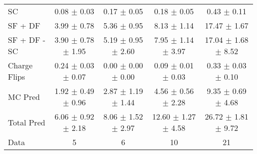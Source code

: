 \begin{tabular}{l|cccc}
                                 SC &  0.08 $\pm$  0.03 &  0.17 $\pm$  0.05 &  0.18 $\pm$  0.05 &  0.43 $\pm$  0.11 \\
                            SF + DF &  3.99 $\pm$  0.78 &  5.36 $\pm$  0.95 &  8.13 $\pm$  1.14 & 17.47 $\pm$  1.67 \\
\hline
                       SF + DF - SC &  3.90 $\pm$  0.78 $\pm$  1.95 &  5.19 $\pm$  0.95 $\pm$  2.60 &  7.95 $\pm$  1.14 $\pm$  3.97 & 17.04 $\pm$  1.68 $\pm$  8.52 \\
\hline\hline
                       Charge Flips &  0.24 $\pm$  0.03 $\pm$  0.07 &  0.00 $\pm$  0.00 $\pm$  0.00 &  0.09 $\pm$  0.01 $\pm$  0.03 &  0.33 $\pm$  0.03 $\pm$  0.10 \\
\hline
                            MC Pred &  1.92 $\pm$  0.49 $\pm$  0.96 &  2.87 $\pm$  1.19 $\pm$  1.44 &  4.56 $\pm$  0.56 $\pm$  2.28 &  9.35 $\pm$  0.69 $\pm$  4.68 \\
\hline
                         Total Pred &  6.06 $\pm$  0.92 $\pm$  2.18 &  8.06 $\pm$  1.52 $\pm$  2.97 & 12.60 $\pm$  1.27 $\pm$  4.58 & 26.72 $\pm$  1.81 $\pm$  9.72 \\
\hline\hline
                               Data &     5 &     6 &    10 &    21 \\
\hline\hline
\end{tabular}

